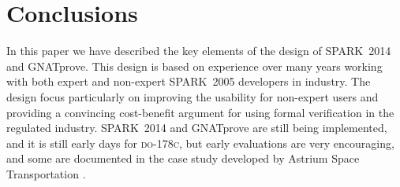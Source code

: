 \documentclass[sttt,final]{svjour}
\newcommand{\DOC}{\textsc{do-178c}}
\newcommand{\gnatprove}{GNATprove\xspace}
\newcommand{\oldspark}{SPARK~2005\xspace}
\newcommand{\newspark}{SPARK~2014\xspace}
\begin{document}

\section{Conclusions}
\label{conclusions}
In this paper we have described the key elements of the design of
\newspark and \gnatprove. This design is based on experience over many
years working with both expert and non-expert \oldspark developers in
industry. The design focus particularly on improving the usability for
non-expert users and providing a convincing cost-benefit argument for
using formal verification in the regulated industry. \newspark and
\gnatprove are still being implemented, and it is still early days for
\DOC, but early evaluations are very encouraging, and some are
documented in the case study developed by Astrium Space Transportation
\cite{dasia2013}.
%


\end{document}
